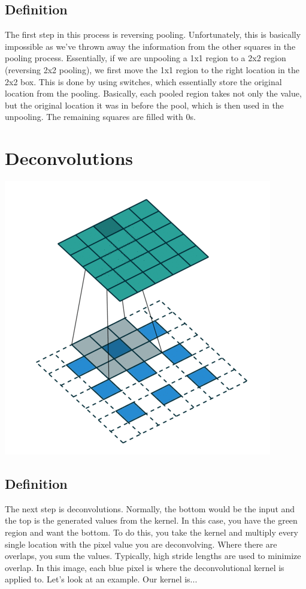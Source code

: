 \documentclass{article}
\begin{document}
\subsection{Definition}
The first step in this process is reversing pooling. Unfortunately, this is basically impossible as we've thrown away the information from the other squares in the pooling process. Essentially, if we are unpooling a 1x1 region to a 2x2 region (reversing 2x2 pooling), we first move the 1x1 region to the right location in the 2x2 box. This is done by using switches, which essentially store the original location from the pooling. Basically, each pooled region takes not only the value, but the original location it was in before the pool, which is then used in the unpooling. The remaining squares are filled with 0s.

\section{Deconvolutions}
\begin{center}
\includegraphics[scale=.50]{deconv}
\end{center}
\subsection{Definition}
The next step is deconvolutions. Normally, the bottom would be the input and the top is the generated values from the kernel. In this case, you have the green region and want the bottom. To do this, you take the kernel and multiply every single location with the pixel value you are deconvolving. Where there are overlaps, you sum the values. Typically, high stride lengths are used to minimize overlap. In this image, each blue pixel is where the deconvolutional kernel is applied to. Let's look at an example. Our kernel is...
\end{document}
